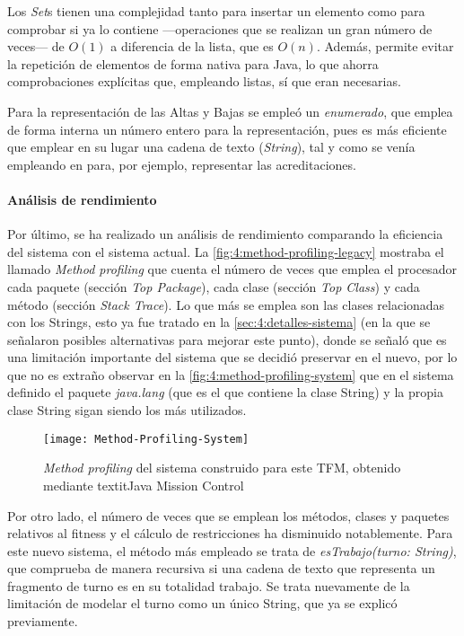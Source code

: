 Los \textit{Set}s tienen una complejidad tanto para insertar un elemento como para comprobar si ya lo contiene ---operaciones que se realizan un gran número de veces--- de $O(1)$ a diferencia de la lista, que es $O(n)$. Además, permite evitar la repetición de elementos de forma nativa para Java, lo que ahorra comprobaciones explícitas que, empleando listas, sí que eran necesarias.

Para la representación de las Altas y Bajas se empleó un \textit{enumerado}, que emplea de forma interna un número entero para la representación, pues es más eficiente que emplear en su lugar una cadena de texto (\textit{String}), tal y como se venía empleando en \legacy{} para, por ejemplo, representar las acreditaciones.

\paragraph{Análisis de rendimiento}
Por último, se ha realizado un análisis de rendimiento comparando la eficiencia del sistema \legacy{} con el sistema actual. La \autoref{fig:4:method-profiling-legacy} mostraba el llamado \textit{Method profiling} que cuenta el número de veces que emplea el procesador cada paquete (sección \textit{Top Package}), cada clase (sección \textit{Top Class}) y cada método (sección \textit{Stack Trace}). Lo que más se emplea son las clases relacionadas con los Strings, esto ya fue tratado en la \autoref{sec:4:detalles-sistema} (en la que se señalaron posibles alternativas para mejorar este punto), donde se señaló que es una limitación importante del sistema \legacy{} que se decidió preservar en el nuevo, por lo que no es extraño observar en la \autoref{fig:4:method-profiling-system} que en el sistema definido el paquete \textit{java.lang} (que es el que contiene la clase String) y la propia clase String sigan siendo los más utilizados.

\begin{figure}
	\centering
	\texttt{[image: Method-Profiling-System]}
	\caption{\textit{Method profiling} del sistema construido para este TFM, obtenido mediante textit{Java Mission Control}}
	\label{fig:4:method-profiling-system}
\end{figure}



Por otro lado, el número de veces que se emplean los métodos, clases y paquetes relativos al fitness y el cálculo de restricciones ha disminuido notablemente. Para este nuevo sistema, el método más empleado se trata de \textit{esTrabajo(turno: String)}, que comprueba de manera recursiva si una cadena de texto que representa un fragmento de turno es en su totalidad trabajo. Se trata nuevamente de la limitación de modelar el turno como un único String, que ya se explicó previamente.

